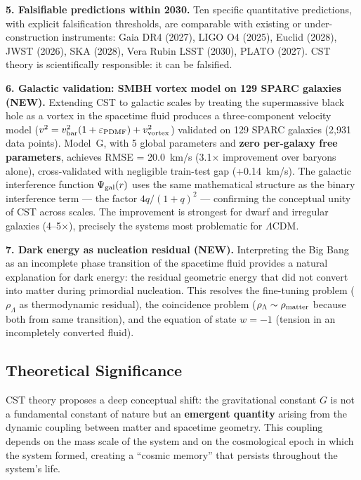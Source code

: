 \documentclass[11pt,a4paper]{article}
\begin{document}
\textbf{5. Falsifiable predictions within 2030.} Ten specific
quantitative predictions, with explicit falsification thresholds, are
comparable with existing or under-construction instruments: Gaia DR4
(2027), LIGO O4 (2025), Euclid (2028), JWST (2026), SKA (2028), Vera
Rubin LSST (2030), PLATO (2027). CST theory is scientifically
responsible: it can be falsified.

\textbf{6. Galactic validation: SMBH vortex model on 129 SPARC galaxies (NEW).}
Extending CST to galactic scales by treating the supermassive black hole as a vortex in the spacetime fluid produces a three-component velocity model ($v^2 = v_{\rm bar}^2(1 + \varepsilon_{\rm PDMF}) + v_{\rm vortex}^2$) validated on 129 SPARC galaxies (2{,}931 data points). Model~G, with 5 global parameters and \textbf{zero per-galaxy free parameters}, achieves RMSE = 20.0~km/s (3.1$\times$ improvement over baryons alone), cross-validated with negligible train-test gap (+0.14~km/s). The galactic interference function $\Psi_{\rm gal}(r)$ uses the same mathematical structure as the binary interference term --- the factor $4q/(1+q)^2$ --- confirming the conceptual unity of CST across scales. The improvement is strongest for dwarf and irregular galaxies (4--5$\times$), precisely the systems most problematic for $\Lambda$CDM.

\textbf{7. Dark energy as nucleation residual (NEW).}
Interpreting the Big Bang as an incomplete phase transition of the spacetime fluid provides a natural explanation for dark energy: the residual geometric energy that did not convert into matter during primordial nucleation. This resolves the fine-tuning problem ($\rho_\Lambda$ as thermodynamic residual), the coincidence problem ($\rho_\Lambda \sim \rho_{\rm matter}$ because both from same transition), and the equation of state $w = -1$ (tension in an incompletely converted fluid).

\hypertarget{theoretical-significance}{%
\subsection{Theoretical
Significance}\label{theoretical-significance}}

CST theory proposes a deep conceptual shift: the gravitational constant
\(G\) is not a fundamental constant of nature but an \textbf{emergent
quantity} arising from the dynamic coupling between matter and spacetime
geometry. This coupling depends on the mass scale of the system and on
the cosmological epoch in which the system formed, creating a ``cosmic
memory'' that persists throughout the system's life.
\end{document}
